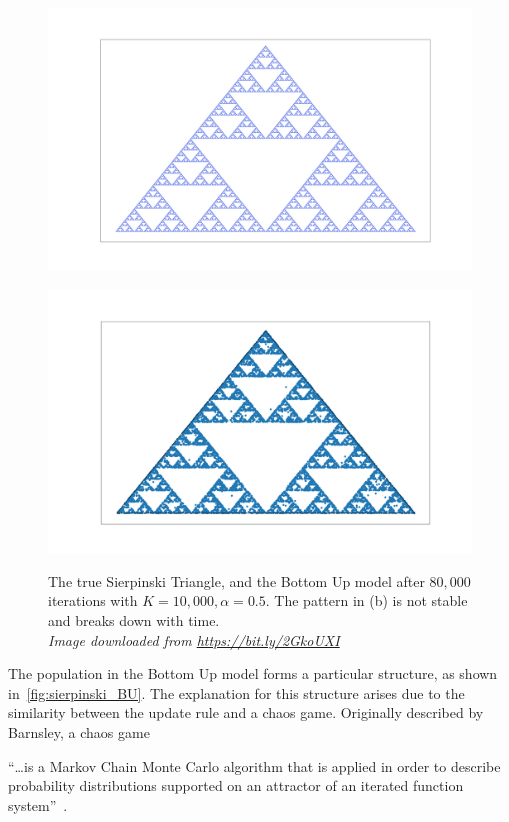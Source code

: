 \begin{figure}[H]
  \begin{minipage}[t]{0.49\textwidth}
    \includegraphics[width=\textwidth]{Images/Misc/Sierpinski_triangle_real_resized.png}
  \end{minipage}
  \hfill
 \begin{minipage}[t]{0.49\textwidth}
    \includegraphics[width=\textwidth]{Images/Figures/Barycenter/Serpinski_BU.png}
     \label{fig:sierpinski_BU}
 \end{minipage}
 \caption{ The true Sierpinski Triangle, and the Bottom Up model after $80,000$ iterations with $K=10,000, \alpha=0.5$. The pattern in (b) is not stable and breaks down with time. \\ \textit{Image downloaded from \url{https://bit.ly/2GkoUXI}}  }\label{fig:sierpinski_compare}
\end{figure}


The population in the Bottom Up model forms a particular structure, as shown in~\cref{fig:sierpinski_BU}. The explanation for this structure arises due to the similarity between the update rule and a chaos game. Originally described by Barnsley, a chaos game
\begin{displayquote} 
    ``\dots is a Markov Chain Monte Carlo algorithm that is applied in order to describe probability distributions supported on an attractor of an iterated function system''~\cite{Barnsley2011ChaosSpaces}.
\end{displayquote}

